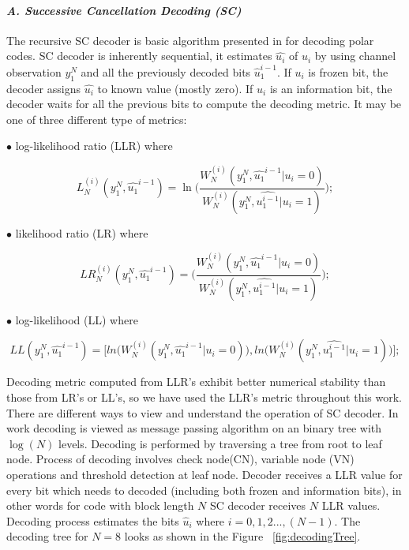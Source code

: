 \paragraph{\emph{A. Successive Cancellation Decoding (SC)}}  \label{SC}
The recursive SC decoder is basic algorithm presented in \cite{Arikan} for decoding polar codes.  SC decoder is inherently sequential, it estimates $\hat{u_{i}}$ of $u_{i}$ by using channel observation $y^{N}_{1}$ and all the previously decoded bits $\hat{u}_{1}^{i-1}$. If $u_{i}$ is frozen bit, the decoder assigns $\hat{u_{i}}$ to known value (mostly zero). If $u_{i}$ is an information bit, the decoder waits for all the previous bits to compute the decoding metric. It may be one of three different type of metrics: \newline

$\bullet$ log-likelihood ratio (LLR) where


\begin{equation}
L_{N}^{(i)}(y_{1}^{N},\hat{u_{1}}^{i-1}) = \ln{\Bigg(\frac{W_{N}^{(i)}(y_{1}^{N},\hat{u_{1}}^{i-1}|u_{i} = 0)} {W_{N}^{(i)}(y_{1}^{N},\hat{u_{1}^{i-1}}|u_{i} = 1)}\Bigg)};
\end{equation}

$\bullet$ likelihood ratio (LR) where 

\begin{equation}
LR_{N}^{(i)}(y_{1}^{N},\hat{u_{1}}^{i-1}) = \Bigg(\frac{W_{N}^{(i)}(y_{1}^{N},\hat{u_{1}}^{i-1}|u_{i} = 0)} {W_{N}^{(i)}(y_{1}^{N},\hat{u_{1}^{i-1}}|u_{i} = 1)}\Bigg);
\end{equation}

$\bullet$ log-likelihood (LL) where 

\begin{equation}
LL(y_{1}^{N},\hat{u_{1}}^{i-1}) = \Big[ln\Big(W_{N}^{(i)}(y_{1}^{N},\hat{u_{1}}^{i-1}|u_{i} = 0)\Big), ln\Big(W_{N}^{(i)}(y_{1}^{N},\hat{u_{1}^{i-1}}|u_{i} = 1)\Big)\Big];
\end{equation}


Decoding metric computed from LLR's exhibit better numerical stability than those from LR's or LL's, so we have used the LLR's metric throughout this work. There are different ways to view and understand the operation of SC decoder. In work decoding is viewed as message passing algorithm on an binary tree with $\log(N)$ levels. Decoding is performed by traversing a tree from root to leaf node. Process of decoding involves check node(CN), variable node (VN) operations and threshold detection at leaf node. Decoder receives a LLR value for every bit which needs to decoded (including both frozen and information bits), in other words for code with block length $N$ SC decoder receives $N$ LLR values. Decoding process estimates the bits $\hat{u}_{i} $  where $i = 0,1,2...,(N-1)$. The decoding tree for $N = 8$ looks as shown in the Figure ~\ref{fig:decodingTree}.

